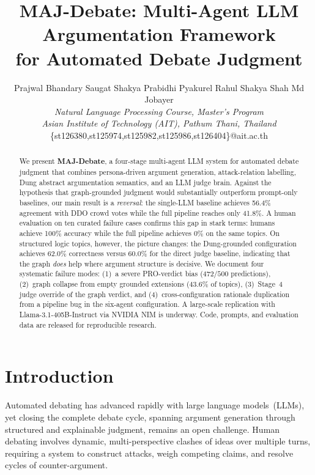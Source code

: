 \documentclass[11pt,twocolumn,letterpaper]{article}
\title{MAJ-Debate: Multi-Agent LLM Argumentation Framework\\
       for Automated Debate Judgment}
\author{Prajwal Bhandary \quad Saugat Shakya \quad Prabidhi Pyakurel \quad Rahul Shakya  \quad Shah Md Jobayer \\[0.3em]
        {\small\itshape Natural Language Processing Course, Master's Program} \\
        {\small\itshape Asian Institute of Technology (AIT), Pathum Thani, Thailand} \\
        {\small\ttfamily \{st126380,st125974,st125982,st125986,st126404\}@ait.ac.th}}
\date{}
\newcommand{\sys}{\textbf{MAJ-Debate}}
\newcommand{\DDOSample}{500}
\newcommand{\BaselineDDO}{56.4}
\newcommand{\FullDDO}{41.8}
\newcommand{\DungNoLogic}{62.0}
\newcommand{\HumanAccuracy}{100}
\newcommand{\FullHumanAgree}{0}
\newcommand{\ProBiasCount}{472}
\newcommand{\EmptyGroundedPct}{43.6}
\newcommand{\LargeModel}{Llama-3.1-405B-Instruct}
\begin{document}
\maketitle

\begin{abstract}
We present \sys{}, a four-stage multi-agent LLM system for automated debate
judgment that combines persona-driven argument generation, attack-relation
labelling, Dung abstract argumentation semantics, and an LLM judge brain.
Against the hypothesis that graph-grounded judgment would substantially
outperform prompt-only baselines, our main result is a \emph{reversal}:
the single-LLM baseline achieves \BaselineDDO\% agreement with DDO crowd
votes while the full pipeline reaches only \FullDDO\%.
A human evaluation on ten curated failure cases confirms this gap in stark terms:
humans achieve \HumanAccuracy\% accuracy while the full pipeline achieves
\FullHumanAgree\% on the same topics.
On structured logic topics, however, the picture changes: the Dung-grounded
configuration achieves \DungNoLogic\% correctness versus 60.0\% for the
direct judge baseline, indicating that the graph \emph{does} help where
argument structure is decisive.
We document four systematic failure modes: (1)~a severe PRO-verdict bias
($\ProBiasCount/\DDOSample$ predictions), (2)~graph collapse from empty
grounded extensions (\EmptyGroundedPct\% of topics), (3)~Stage~4 judge
override of the graph verdict, and (4)~cross-configuration rationale
duplication from a pipeline bug in the six-agent configuration.
A large-scale replication with \LargeModel{} via NVIDIA NIM is underway.
Code, prompts, and evaluation data are released for reproducible research.
\end{abstract}

\section{Introduction}

Automated debating has advanced rapidly with large language models~(LLMs),
yet closing the complete debate cycle, spanning argument generation through
structured and explainable judgment, remains an open challenge. Human debating involves
dynamic, multi-perspective clashes of ideas over multiple turns, requiring
a system to construct attacks, weigh competing claims, and resolve cycles of
counter-argument.
\end{document}
